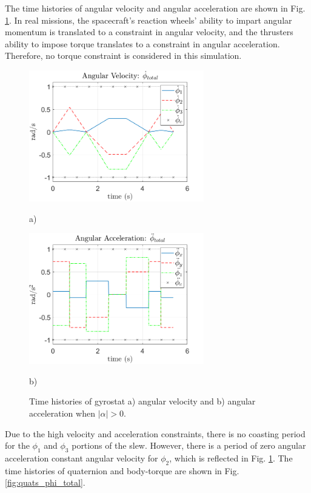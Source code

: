 \documentclass[letterpaper, paper,12pt]{AAS}		%
\begin{document}
The time histories of angular velocity and angular acceleration are shown in Fig. \ref{fig:ang_vel_acc}. In real missions, the spacecraft's reaction wheels' ability to impart angular momentum is translated to a constraint in angular velocity, and the thrusters ability to impose torque translates to a constraint in angular acceleration. Therefore, no torque constraint is considered in this simulation.
\begin{figure}[!ht]
    \centering
    \begin{minipage}{.5\textwidth}
        \centering
    \includegraphics[width=3in]{figures/alphaNot0/ang_vel_phi_total.png}
    \caption{a)}
    \end{minipage}%
    \begin{minipage}{0.5\textwidth}
        \centering
        \includegraphics[width=3in]{figures/alphaNot0/ang_accel_total.png}
       \caption{b)}
    \end{minipage}

    \caption{Time histories of gyrostat a) angular velocity and b) angular acceleration when $|\alpha|>0$.}
    \label{fig:ang_vel_acc} 
\end{figure}
Due to the high velocity and acceleration constraints, there is no coasting period for the $\phi_1$ and $\phi_3$ portions of the slew. However, there is a period of zero angular acceleration constant angular velocity for $\phi_2$, which is reflected in Fig. \ref{fig:ang_vel_acc}. The time histories of quaternion and body-torque are shown in Fig. \ref{fig:quats_phi_total}.
\end{document}
